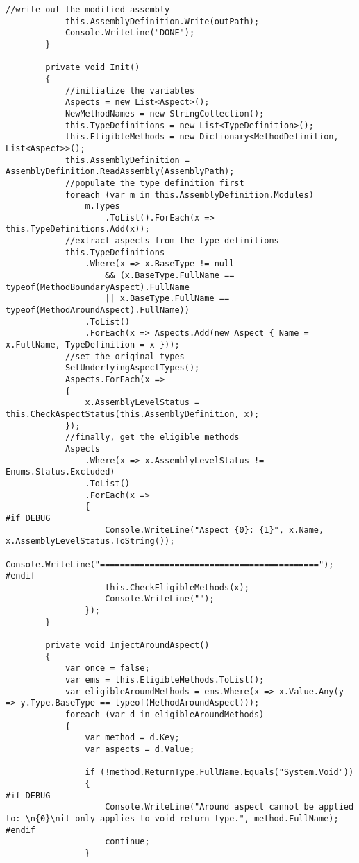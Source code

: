 \begin{lstlisting}[caption={../buffalo/Weaver.cs}, label=../buffalo/Weaver.cs, frame=tb, basicstyle=\scriptsize]
            //write out the modified assembly
            this.AssemblyDefinition.Write(outPath);
            Console.WriteLine("DONE");
        }

        private void Init()
        {
            //initialize the variables
            Aspects = new List<Aspect>();
            NewMethodNames = new StringCollection();
            this.TypeDefinitions = new List<TypeDefinition>();
            this.EligibleMethods = new Dictionary<MethodDefinition, List<Aspect>>();
            this.AssemblyDefinition = AssemblyDefinition.ReadAssembly(AssemblyPath);
            //populate the type definition first
            foreach (var m in this.AssemblyDefinition.Modules)
                m.Types
                    .ToList().ForEach(x => this.TypeDefinitions.Add(x));
            //extract aspects from the type definitions
            this.TypeDefinitions
                .Where(x => x.BaseType != null 
                    && (x.BaseType.FullName == typeof(MethodBoundaryAspect).FullName 
                    || x.BaseType.FullName == typeof(MethodAroundAspect).FullName))
                .ToList()
                .ForEach(x => Aspects.Add(new Aspect { Name = x.FullName, TypeDefinition = x }));
            //set the original types
            SetUnderlyingAspectTypes();
            Aspects.ForEach(x =>
            {
                x.AssemblyLevelStatus = this.CheckAspectStatus(this.AssemblyDefinition, x);
            });
            //finally, get the eligible methods
            Aspects
                .Where(x => x.AssemblyLevelStatus != Enums.Status.Excluded)
                .ToList()
                .ForEach(x =>
                {
#if DEBUG
                    Console.WriteLine("Aspect {0}: {1}", x.Name, x.AssemblyLevelStatus.ToString());
                    Console.WriteLine("============================================");
#endif
                    this.CheckEligibleMethods(x);
                    Console.WriteLine("");
                });
        }

        private void InjectAroundAspect()
        {
            var once = false;
            var ems = this.EligibleMethods.ToList();
            var eligibleAroundMethods = ems.Where(x => x.Value.Any(y => y.Type.BaseType == typeof(MethodAroundAspect)));
            foreach (var d in eligibleAroundMethods)
            {
                var method = d.Key;
                var aspects = d.Value;

                if (!method.ReturnType.FullName.Equals("System.Void"))
                {
#if DEBUG
                    Console.WriteLine("Around aspect cannot be applied to: \n{0}\nit only applies to void return type.", method.FullName);
#endif
                    continue;
                }


\end{lstlisting}

